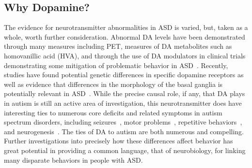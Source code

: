 %
% 

\subsection{Why Dopamine?} 
The evidence for neurotransmitter abnormalities in ASD is varied, but, taken as a whole, worth further consideration.
Abnormal DA levels have been demonstrated through many measures including PET, measures of DA metabolites such as homovanillic acid (HVA), and through the use of DA modulators in clinical trials demonstrating some mitigation of problematic behavior in ASD~\cite{FernellE:1997:AutismPET,MartineauJ:1992:AutismDA,TsaiLY:1999:AutismDA}.  Recently, studies have found potential genetic differences in specific dopamine receptors as well as evidence that differences in the morphology of the basal ganglia is potentially relevant in ASD~\cite{deJongeM:2012:DopamineASDGenetics,MostofskySH:2010:BasalGangliaASDMotor}.  While the precise causal role, if any, that DA plays in autism is still an active area of investigation, this neurotransmitter does have interesting ties to numerous core deficits and related symptoms in autism spectrum disorders, including seizures~\cite{StarrMS:1996:SeizuresDA,TuchmanR:2002:EpilepsyAutism}, motor problems~\cite{RinehartNJ:2001:AutismMovement,RinehartNJ:2006:AutismGait}, repetitive behaviors~\cite{CanalesJJ:2000:Stereotypy,RalphRJ:2001:Perseveration,Ralph-WilliansRJ:2003:HyperactiveDA}, and neurogenesis~\cite{BortaA:2007:NeurogenesisDA}.  The ties of DA to autism are both numerous and compelling.  Further investigations into precisely how these differences affect behavior has great potential in providing a common language, that of neurobiology, for linking many disparate behaviors in people with ASD.


